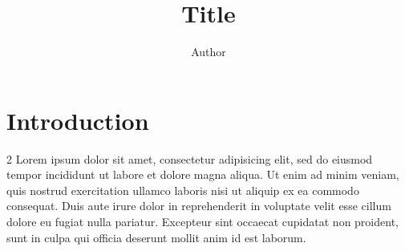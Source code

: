 \documentclass[kulak]{kulakposter}
\title{Title}
\institute{Institute}
\author{Author}
\begin{document}
\maketitle

\section*{Introduction}
\begin{multicols}{2}\setlength{\columnseprule}{0pt}
	Lorem ipsum dolor sit amet, consectetur adipisicing elit, sed do eiusmod tempor incididunt ut labore et dolore magna aliqua. Ut enim ad minim veniam, quis nostrud exercitation ullamco laboris nisi ut aliquip ex ea commodo consequat. Duis aute irure dolor in reprehenderit in voluptate velit esse cillum dolore eu fugiat nulla pariatur. Excepteur sint occaecat cupidatat non proident, sunt in culpa qui officia deserunt mollit anim id est laborum.
\end{multicols}
\end{document}
